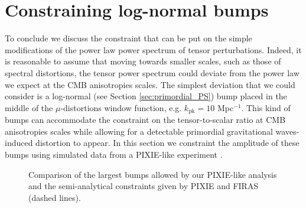 \section{Constraining log-normal bumps}
To conclude we discuss the constraint that can be put on the simple modifications of the power law power spectrum of tensor perturbations. Indeed, it is reasonable to assume that moving towards smaller scales, such as those of spectral distortions, the tensor power spectrum could deviate from the power law we expect at the CMB anisotropies scales. The simplest deviation that we could consider is a log-normal (see Section \ref{sec:primordial_PS}) bump placed in the middle of the $\mu$-distortions window function, e.g. $k_\text{pk}=10$ Mpc$^{-1}$. This kind of bumps can accommodate the constraint on the tensor-to-scalar ratio at CMB anisotropies scales while allowing for a detectable primordial gravitational waves-induced distortion to appear.
In this section we constraint the amplitude of these bumps using simulated data from a PIXIE-like experiment \cite{pixie}.
\begin{figure}
    \centering
{}
\caption{Comparison of the largest bumps allowed by our PIXIE-like analysis and the semi-analytical constraints given by PIXIE and FIRAS (dashed lines).}
\label{fig:analy_const_bump}
\end{figure}


